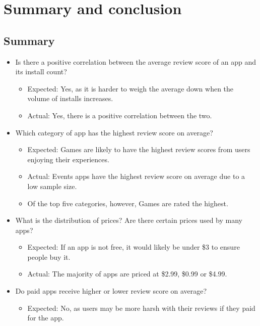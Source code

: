 \documentclass[12pt]{report}\usepackage[]{graphicx}\usepackage[]{xcolor}
\begin{document}
\chapter{Summary and conclusion}



\section{Summary}
\begin{itemize}
    \item Is there a positive correlation between the average review score of an app and its install count? 
    \begin{itemize}
        \item Expected: Yes, as it is harder to weigh the average down when the volume
        of installs increases.
        \item Actual: Yes, there is a positive correlation between the two.
    \end{itemize}
    \item Which category of app has the highest review score on average?
    \begin{itemize}
        \item Expected: Games are likely to have the highest review scores from users
        enjoying their experiences.
        \item Actual: Events apps have the highest review score on average due to a low sample size.
        \item Of the top five categories, however, Games are rated the highest.
    \end{itemize}
    \item What is the distribution of prices? Are there certain prices used by many apps?
    \begin{itemize}
        \item Expected: If an app is not free, it would likely be under \$3 to ensure
        people buy it.
        \item Actual: The majority of apps are priced at \$2.99, \$0.99 or \$4.99.
    \end{itemize}
    \item Do paid apps receive higher or lower review score on average?
    \begin{itemize}
        \item Expected: No, as users may be more harsh with their reviews if they paid
        for the app.

\end{itemize}
\end{itemize}
\end{document}
